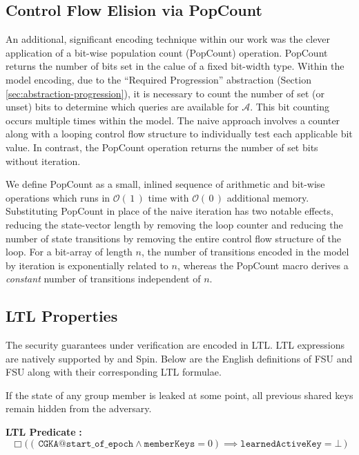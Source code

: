 \documentclass[runningheads]{llncs}
\newcommand{\Abrev}[1]{\gls{#1}}
\newcommand{\Adversary}{\ensuremath{\mathcal{A}}\xspace}
\newcommand{\BigO}[1]{\ensuremath{\mathcal{O}\left(\,#1\,\right)}\xspace}
\begin{document}
\subsection{Control Flow Elision via PopCount\label{sec:popcount}}

An additional, significant \Promela encoding technique within our work was the clever application of a bit-wise population count (PopCount) operation.
PopCount returns the number of bits set in the calue of a fixed bit-width type.
Within the model encoding, due to the ``Required Progression''  abstraction (Section \ref{sec:abstraction-progression}), it is necessary to count the number of set (or unset) bits to determine which queries are available for \Adversary.
This bit counting occurs multiple times within the model.
The naive approach involves a counter along with a looping control flow structure to individually test each applicable bit value.
In contrast, the PopCount operation returns the number of set bits without iteration.

We define PopCount as a small, inlined sequence of arithmetic and bit-wise operations which runs in \BigO{1} time with \BigO{0} additional memory.
Substituting PopCount in place of the naive iteration has two notable effects, reducing the state-vector length by removing the loop counter and reducing the number of state transitions by removing the entire control flow structure of the loop.
For a bit-array of length $n$, the number of transitions encoded in the model by iteration is exponentially related to $n$, whereas the PopCount macro derives a \emph{constant} number of transitions independent of $n$.

\subsection{LTL Properties}

The security guarantees under verification are encoded in \Abrev{LTL}.
\Abrev{LTL} expressions are natively supported by \Promela and Spin.
Below are the English definitions of \Abrev{FSU} and \Abrev{FSU} along with their corresponding \Abrev{LTL} formulae.

\begin{definition}
If the state of any group member is leaked at some point, all previous shared keys remain hidden from the adversary.
\end{definition}%
\noindent\textbf{LTL Predicate} \textbf{:}%
\[%
\Box \Big( \left(\, \texttt{CGKA@start\_of\_epoch} \land \texttt{memberKeys} = 0\right) \implies \texttt{learnedActiveKey} = \bot \, \Big)%
\]%
\end{document}
